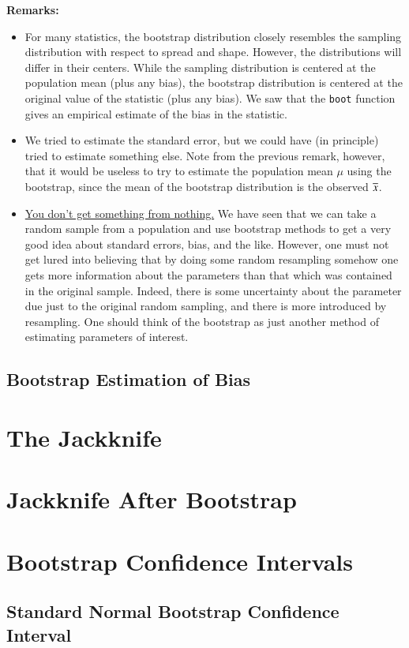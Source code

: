 \documentclass[captions=tableheading]{scrbook}
\begin{document}
\textbf{Remarks:}

\begin{itemize}
\item For many statistics, the bootstrap distribution closely resembles the sampling distribution with respect to spread and shape. However, the distributions will differ in their centers. While the sampling distribution is centered at the population mean (plus any bias), the bootstrap distribution is centered at the original value of the statistic (plus any bias). We saw that the \texttt{boot} function gives an empirical estimate of the bias in the statistic.
\item We tried to estimate the standard error, but we could have (in principle) tried to estimate something else. Note from the previous remark, however, that it would be useless to try to estimate the population mean $\mu$ using the bootstrap, since the mean of the bootstrap distribution is the observed $\overline{x}$.
\item \underline{You don't get something from nothing.} We have seen that we can take a random sample from a population and use bootstrap methods to get a very good idea about standard errors, bias, and the like. However, one must not get lured into believing that by doing some random resampling somehow one gets more information about the parameters than that which was contained in the original sample. Indeed, there is some uncertainty about the parameter due just to the original random sampling, and there is more introduced by resampling. One should think of the bootstrap as just another method of estimating parameters of interest.
\end{itemize}
\subsection{Bootstrap Estimation of Bias}
\label{sec-4_2_2}
\section{The Jackknife}
\label{sec-4_3}
\section{Jackknife After Bootstrap}
\label{sec-4_4}
\section{Bootstrap Confidence Intervals}
\label{sec-4_5}
\subsection{Standard Normal Bootstrap Confidence Interval}
\label{sec-4_5_1}
\end{document}
